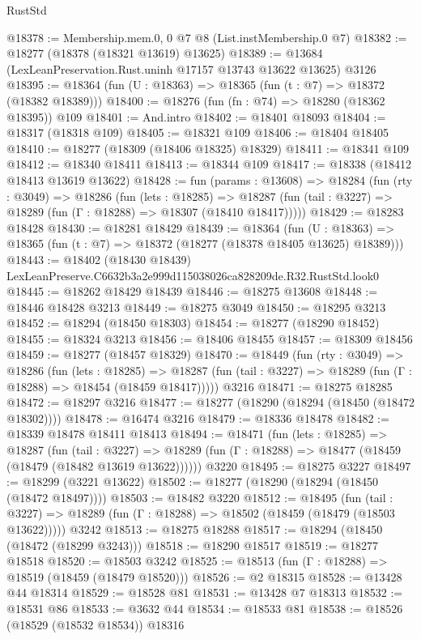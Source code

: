 \begin{lexlean}{RustStd}
\begin{coremodule}
@18378 := Membership.mem.{0, 0} @7 @8 (List.instMembership.{0} @7)
@18382 := @18277 (@18378 (@18321 @13619) @13625)
@18389 := @13684 (LexLeanPreservation.Rust.uninh @17157 @13743 @13622 @13625) @3126
@18395 := @18364 (fun (U : @18363) => @18365 (fun (t : @7) => @18372 (@18382 @18389)))
@18400 := @18276 (fun (fn : @74) => @18280 (@18362 @18395)) @109
@18401 := And.intro
@18402 := @18401 @18093
@18404 := @18317 (@18318 @109)
@18405 := @18321 @109
@18406 := @18404 @18405
@18410 := @18277 (@18309 (@18406 @18325) @18329)
@18411 := @18341 @109
@18412 := @18340 @18411
@18413 := @18344 @109
@18417 := @18338 (@18412 @18413 @13619 @13622)
@18428 := fun (params : @13608) =>
  @18284
    (fun (rty : @3049) =>
    @18286
      (fun (lets : @18285) =>
      @18287 (fun (tail : @3227) => @18289 (fun (Γ : @18288) => @18307 (@18410 @18417)))))
@18429 := @18283 @18428
@18430 := @18281 @18429
@18439 := @18364
    (fun (U : @18363) => @18365 (fun (t : @7) => @18372 (@18277 (@18378 @18405 @13625) @18389)))
@18443 := @18402 (@18430 @18439) LexLeanPreserve.C6632b3a2e999d115038026ca828209de.R32.RustStd.look0
@18445 := @18262 @18429 @18439
@18446 := @18275 @13608
@18448 := @18446 @18428 @3213
@18449 := @18275 @3049
@18450 := @18295 @3213
@18452 := @18294 (@18450 @18303)
@18454 := @18277 (@18290 @18452)
@18455 := @18324 @3213
@18456 := @18406 @18455
@18457 := @18309 @18456
@18459 := @18277 (@18457 @18329)
@18470 := @18449
    (fun (rty : @3049) =>
    @18286
      (fun (lets : @18285) =>
      @18287 (fun (tail : @3227) => @18289 (fun (Γ : @18288) => @18454 (@18459 @18417)))))
    @3216
@18471 := @18275 @18285
@18472 := @18297 @3216
@18477 := @18277 (@18290 (@18294 (@18450 (@18472 @18302))))
@18478 := @16474 @3216
@18479 := @18336 @18478
@18482 := @18339 @18478 @18411 @18413
@18494 := @18471
    (fun (lets : @18285) =>
    @18287
      (fun (tail : @3227) =>
      @18289 (fun (Γ : @18288) => @18477 (@18459 (@18479 (@18482 @13619 @13622))))))
    @3220
@18495 := @18275 @3227
@18497 := @18299 (@3221 @13622)
@18502 := @18277 (@18290 (@18294 (@18450 (@18472 @18497))))
@18503 := @18482 @3220
@18512 := @18495
    (fun (tail : @3227) => @18289 (fun (Γ : @18288) => @18502 (@18459 (@18479 (@18503 @13622)))))
    @3242
@18513 := @18275 @18288
@18517 := @18294 (@18450 (@18472 (@18299 @3243)))
@18518 := @18290 @18517
@18519 := @18277 @18518
@18520 := @18503 @3242
@18525 := @18513 (fun (Γ : @18288) => @18519 (@18459 (@18479 @18520)))
@18526 := @2 @18315
@18528 := @13428 @44 @18314
@18529 := @18528 @81
@18531 := @13428 @7 @18313
@18532 := @18531 @86
@18533 := @3632 @44
@18534 := @18533 @81
@18538 := @18526 (@18529 (@18532 @18534)) @18316

\end{coremodule}
\end{lexlean}
